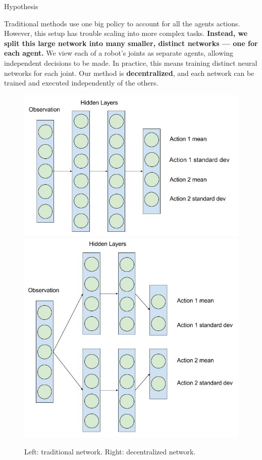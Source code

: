 \documentclass[final]{beamer}
\newlength{\onecolwid}
\newlength{\twocolwid}
\begin{document}
\begin{frame}[t]
\begin{columns}[t]
\begin{column}{\twocolwid}

\begin{columns}[t,totalwidth=\twocolwid] %

\begin{column}{\onecolwid} %


\vspace{-1.3cm}

\begin{block}{Hypothesis}

Traditional methods use one big policy to account for all the agents actions. 
However, this setup has trouble scaling into more complex tasks. \textbf{Instead, we split this large network into many smaller, distinct networks --- one for each agent.} We view each of a robot's joints as separate agents, allowing independent decisions to be made. In practice, this means training distinct neural networks for each joint. Our method is \textbf{decentralized}, and each network can be trained and executed independently of the others.
	
\begin{figure}
\includegraphics[width=0.4\linewidth]{syn-regnet.jpg}
\includegraphics[width=0.4\linewidth]{syn-splitnet.jpg}
\caption{Left: traditional network. Right: decentralized network.}
\end{figure}


\end{block}
\end{column}
\end{columns}
\end{column}
\end{columns}
\end{frame}
\end{document}
